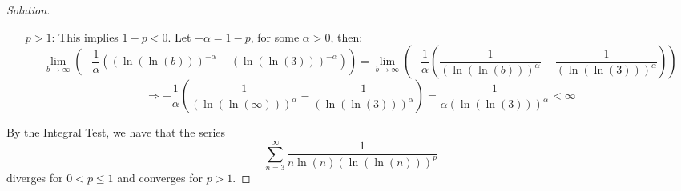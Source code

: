 \documentclass{article}
\newcommand{\parens}[1]{\left(#1\right)}
\begin{document}
\begin{proof}[Solution]
\begin{itemize}
		\item[$p > 1$:] This implies $1 - p < 0$. Let $-\alpha = 1 - p$, for some $\alpha > 0$, then:
		$$\lim_{b\to\infty}\parens{-\frac{1}{\alpha}\parens{\parens{\ln\parens{\ln(b)}}^{-\alpha}-\parens{\ln\parens{\ln(3)}}^{-\alpha}}} = \lim_{b\to\infty}\parens{-\frac{1}{\alpha}\parens{\frac{1}{\parens{\ln\parens{\ln(b)}}^{\alpha}}-\frac{1}{\parens{\ln\parens{\ln(3)}}^{\alpha}}}}$$
		$$\Rightarrow -\frac{1}{\alpha}\parens{\frac{1}{\parens{\ln\parens{\ln(\infty)}}^{\alpha}}-\frac{1}{\parens{\ln\parens{\ln(3)}}^{\alpha}}} = \frac{1}{\alpha\parens{\ln\parens{\ln(3)}}^{\alpha}} < \infty$$
	\end{itemize}
	By the Integral Test, we have that the series 
	$$\sum_{n=3}^\infty \frac{1}{n\ln(n) \parens{\ln\parens{\ln(n)}}^p}$$
	diverges for $0 < p \leq 1$ and converges for $p > 1$.
	\end{proof}
	
\end{document}
